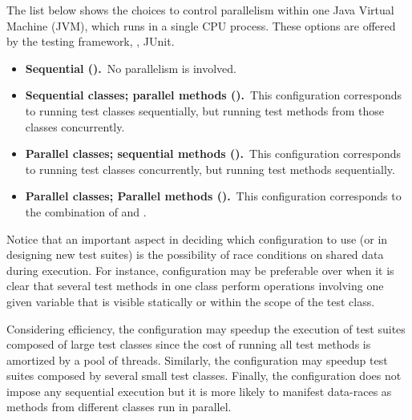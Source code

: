 The list below shows the choices to control parallelism within one
Java Virtual Machine (JVM), which runs in a single CPU process.  These
options are offered by the testing framework, \eg{}, JUnit.

\begin{itemize}
\item
    \textbf{Sequential (\Seq).}~No parallelism is involved.
\item
    \textbf{Sequential classes; parallel methods
      (\SeqClassParMeth).}~This configuration corresponds to running
    test classes sequentially, but running test methods from those
    classes concurrently.
\item
    \textbf{Parallel classes; sequential methods
      (\ParClassSeqMeth{}).}~This configuration corresponds to running
    test classes concurrently, but running test methods sequentially.
\item
    \textbf{Parallel classes; Parallel methods
      (\ParClassParMeth).}~This configuration corresponds to the
    combination of \SeqClassParMeth{} and \ParClassSeqMeth{}.  
\end{itemize}


Notice that an important aspect in deciding which configuration to use
(or in designing new test suites) is the possibility of race
conditions on shared data during execution. For instance,
configuration \ParClassSeqMeth{} may be preferable over
\SeqClassParMeth{} when it is clear that several test methods in one
class perform operations involving one given variable that is visible
statically or within the scope of the test class.

Considering efficiency, the
configuration \SeqClassParMeth{} may speedup the execution of test
suites composed of large test classes since the cost of running all
test methods is amortized by a pool of threads. Similarly, the configuration \ParClassSeqMeth{} may speedup
test suites composed by several small test classes.  Finally, the configuration
\ParClassParMeth{} does not impose any sequential execution but it is
more likely to manifest data-races as methods from different classes
run in parallel.

